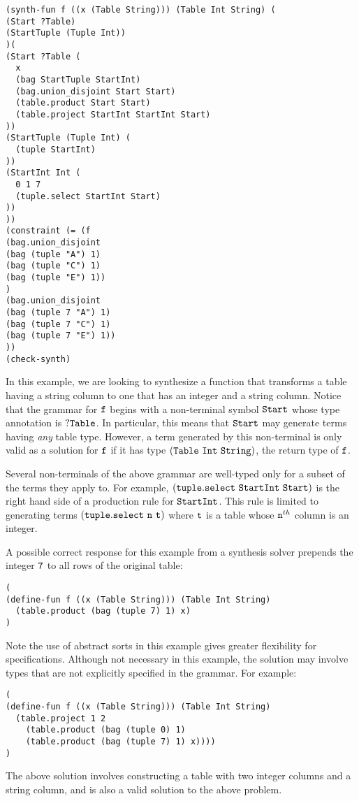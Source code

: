 \documentclass[english,a4paper,10pt]{article}
\begin{document}
\begin{verbatim}
(synth-fun f ((x (Table String))) (Table Int String) (
(Start ?Table)
(StartTuple (Tuple Int))
)(
(Start ?Table (
  x
  (bag StartTuple StartInt)
  (bag.union_disjoint Start Start)
  (table.product Start Start)
  (table.project StartInt StartInt Start)
))
(StartTuple (Tuple Int) (
  (tuple StartInt)
))
(StartInt Int (
  0 1 7
  (tuple.select StartInt Start)
))
))
(constraint (= (f 
(bag.union_disjoint
(bag (tuple "A") 1)
(bag (tuple "C") 1)
(bag (tuple "E") 1))
)
(bag.union_disjoint
(bag (tuple 7 "A") 1)
(bag (tuple 7 "C") 1)
(bag (tuple 7 "E") 1))
))
(check-synth)
\end{verbatim}
In this example, we are looking to synthesize a function that transforms
a table having a string column to one that has an integer and a string column.
Notice that the grammar for ${\tt f}$ begins with a non-terminal
symbol ${\tt Start}$ whose type annotation is ${\tt ?Table}$.
In particular, this means that ${\tt Start}$ may generate terms having
\emph{any} table type. However, a term generated by this non-terminal is
only valid as a solution for ${\tt f}$ if it has type ${\tt (Table\ Int\ String)}$,
the return type of ${\tt f}$.

Several non-terminals of the above grammar are well-typed only for a subset of the terms they apply to.
For example, ${\tt (tuple.select\ StartInt\ Start)}$ is the right hand side of
a production rule for ${\tt StartInt}$.
This rule is limited to generating terms
$\syntax{(tuple.select\ n\ t)}$ where ${\tt t}$ is a table whose ${\tt n}^{th}$ column is an integer.

A possible correct response for this example from a synthesis solver 
prepends the integer ${\tt 7}$ to all rows of the original table:
\begin{verbatim}
(
(define-fun f ((x (Table String))) (Table Int String) 
  (table.product (bag (tuple 7) 1) x)
)
\end{verbatim}

Note the use of abstract sorts in this example gives
greater flexibility for specifications. 
Although not necessary in this example, the solution
may involve types that are not explicitly specified in the grammar.
For example:
\begin{verbatim}
(
(define-fun f ((x (Table String))) (Table Int String) 
  (table.project 1 2 
    (table.product (bag (tuple 0) 1) 
    (table.product (bag (tuple 7) 1) x))))
)
\end{verbatim}
The above solution involves constructing a table with two integer columns and a string column,
and is also a valid solution to the above problem.
\end{document}
